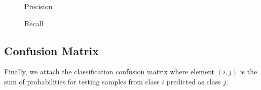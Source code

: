\documentclass[]{report}   %
\begin{document}
\begin{figure}[H]
\label{fig:?}
\caption{Precision}
    \centering
    \def\svgwidth{\columnwidth}
    
\end{figure}

\begin{figure}[H]
\label{fig:?}
\caption{Recall}
    \centering
    \def\svgwidth{\columnwidth}
    
\end{figure}

\newpage
\subsection*{Confusion Matrix}
Finally, we attach the classification confusion matrix where element $(i,j)$ is the sum of probabilities for testing samples from class $i$ predicted as class $j$.
\\\\

\end{document}
